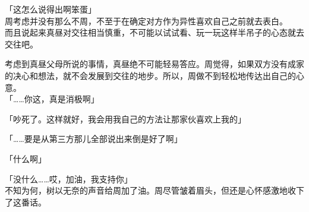 「这怎么说得出啊笨蛋」\\

周考虑并没有那么不周，不至于在确定对方作为异性喜欢自己之前就去表白。\\

而且说起来真昼对交往相当慎重，不可能以试试看、玩一玩这样半吊子的心态就去交往吧。

考虑到真昼父母所说的事情，真昼绝不可能轻易答应。周觉得，如果双方没有成家的决心和想法，就不会发展到交往的地步。所以，周做不到轻松地传达出自己的心意。\\

「……你这，真是消极啊」

「吵死了。这样就好，我会用我自己的方法让那家伙喜欢上我的」

「……要是从第三方那儿全部说出来倒是好了啊」

「什么啊」

「没什么……哎，加油，我支持你」\\

不知为何，树以无奈的声音给周加了油。周尽管皱着眉头，但还是心怀感激地收下了这番话。
